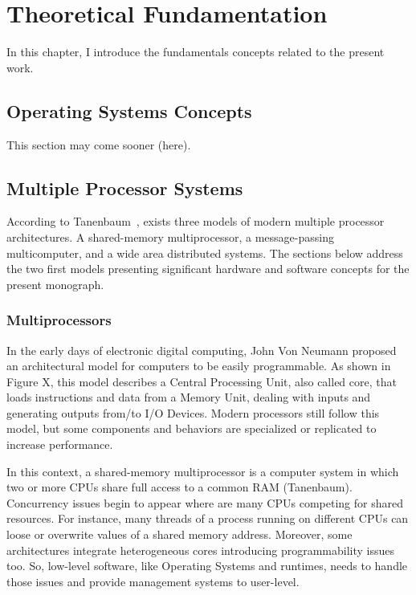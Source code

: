 \chapter{Theoretical Fundamentation} %
\label{ch.fundamentation}

	In this chapter, I introduce the fundamentals concepts related to the present work.

\section{Operating Systems Concepts}
	This section may come sooner (here).

\section{Multiple Processor Systems}
\label{sec.multiple_processor_systems}

	According to Tanenbaum~\cite{tanenbaum:4ed}, exists three models of
	modern multiple processor architectures.
	A shared-memory multiprocessor, a message-passing multicomputer, and a
	wide area distributed systems.
	The sections below address the two first models presenting significant
	hardware and software concepts for the present monograph.

	\subsection{Multiprocessors}

		In the early days of electronic digital computing, John Von Neumann proposed
		an architectural model for computers to be easily programmable.
		As shown in Figure X, this model describes a Central Processing Unit, also
		called core, that loads instructions and data from a Memory Unit, dealing
		with inputs and generating outputs from/to I/O Devices.
		Modern processors still follow this model, but some components and behaviors
		are specialized or replicated to increase performance.
		
		In this context, a shared-memory multiprocessor is a computer system in which
		two or more CPUs share full access to a common RAM (Tanenbaum).
		Concurrency issues begin to appear where are many CPUs competing for shared resources.
		For instance, many threads of a process running on different CPUs can loose
		or overwrite values of a shared memory address.
		Moreover, some architectures integrate heterogeneous cores introducing
		programmability issues too.
		So, low-level software, like Operating Systems and runtimes, needs to handle
		those issues and provide management systems to user-level.
		
